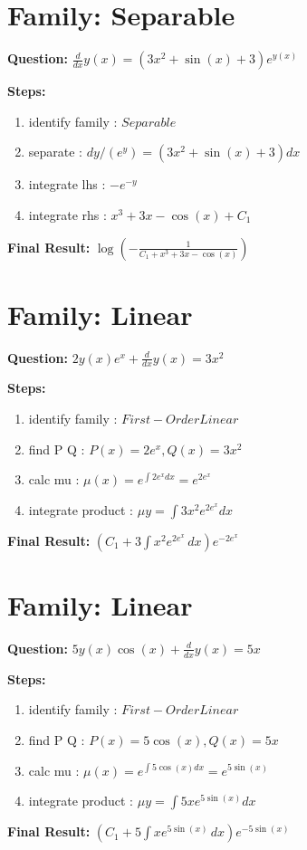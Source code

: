 \documentclass{article}
\begin{document}
\section*{Family: Separable}
\textbf{Question:} $\frac{d}{d x} y{\left(x \right)} = \left(3 x^{2} + \sin{\left(x \right)} + 3\right) e^{y{\left(x \right)}}$

\textbf{Steps:}
\begin{enumerate}
\item identify family :  $Separable$
\item separate :  $dy / (e^{y}) = (3 x^{2} + \sin{\left(x \right)} + 3) dx$
\item integrate lhs :  $- e^{- y}$
\item integrate rhs :  $x^{3} + 3 x - \cos{\left(x \right)} + C_1$
\end{enumerate}
\textbf{Final Result:} $\log{\left(- \frac{1}{C_{1} + x^{3} + 3 x - \cos{\left(x \right)}} \right)}$

\section*{Family: Linear}
\textbf{Question:} $2 y{\left(x \right)} e^{x} + \frac{d}{d x} y{\left(x \right)} = 3 x^{2}$

\textbf{Steps:}
\begin{enumerate}
\item identify family :  $First-Order Linear$
\item find P Q :  $P(x)=2 e^{x}, Q(x)=3 x^{2}$
\item calc mu :  $\mu(x) = e^{\int 2 e^{x} dx} = e^{2 e^{x}}$
\item integrate product :  $\mu y = \int 3 x^{2} e^{2 e^{x}} dx$
\end{enumerate}
\textbf{Final Result:} $\left(C_{1} + 3 \int x^{2} e^{2 e^{x}}\, dx\right) e^{- 2 e^{x}}$

\section*{Family: Linear}
\textbf{Question:} $5 y{\left(x \right)} \cos{\left(x \right)} + \frac{d}{d x} y{\left(x \right)} = 5 x$

\textbf{Steps:}
\begin{enumerate}
\item identify family :  $First-Order Linear$
\item find P Q :  $P(x)=5 \cos{\left(x \right)}, Q(x)=5 x$
\item calc mu :  $\mu(x) = e^{\int 5 \cos{\left(x \right)} dx} = e^{5 \sin{\left(x \right)}}$
\item integrate product :  $\mu y = \int 5 x e^{5 \sin{\left(x \right)}} dx$
\end{enumerate}
\textbf{Final Result:} $\left(C_{1} + 5 \int x e^{5 \sin{\left(x \right)}}\, dx\right) e^{- 5 \sin{\left(x \right)}}$
\end{document}
